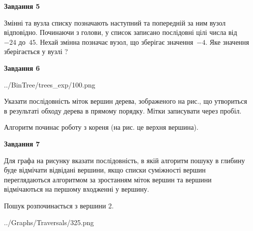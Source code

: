 \documentclass[12pt, ukrainian]{article}
\begin{document}
{\begin {large}
{\begin {center}\textbf{Завдання 5}\end {center}}\par
Змінні  та  вузла списку позначають наступний та попередній за ним вузол відповідно. Починаючи з голови, у список записано послідовні цілі числа від~$-24$ до~$45$. Нехай змінна  позначає вузол, що зберігає значення~$-4$.
Яке значення зберігається у вузлі  ?\par
\newpage

{\begin {center}\textbf{Завдання 6}\end {center}}\par

\begin{center}
	{../BinTree/trees_exp/100.png}
\end{center}
Указати послідовність міток вершин дерева, зображеного на рис., що утвориться в результаті обходу дерева в прямому порядку. Мітки записувати через пробіл.\par Алгоритм починає роботу з кореня (на рис. це верхня вершина).\par
\newpage

{\begin {center}\textbf{Завдання 7}\end {center}}\par
Для графа на рисунку вказати послідовність, в якій алгоритм пошуку в глибину буде відмічати відвідані вершини, якщо списки суміжності вершин переглядаються алгоритмом за зростанням міток вершин та вершини відмічаються на першому вход\-женні у вершину.\par
Пошук розпочинається з вершини 2.\par

\begin{center}
	{../Graphs/Traversals/325.png}
\end{center}\par
\newpage


\end{large}}
\end{document}
